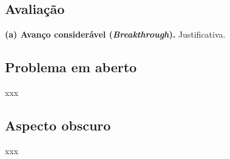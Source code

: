 \subsection{Avaliação}
\textbf{(a) Avanço considerável (\textit{Breakthrough}).}
Justificativa.

\subsection{Problema em aberto}
xxx

\subsection{Aspecto obscuro}
xxx